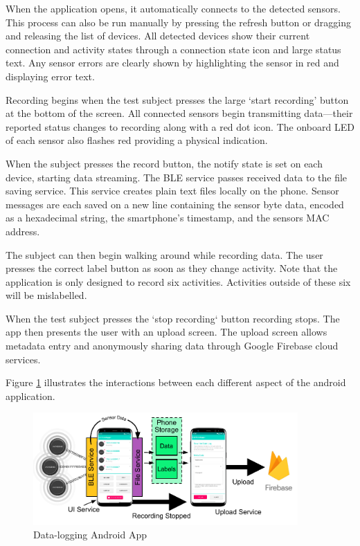 When the application opens, it automatically connects to the detected sensors. This process can also be run manually by pressing the refresh button or dragging and releasing the list of devices. All detected devices show their current connection and activity states through a connection state icon and large status text. Any sensor errors are clearly shown by highlighting the sensor in red and displaying error text.

Recording begins when the test subject presses the large `start recording' button at the bottom of the screen. All connected sensors begin transmitting data—their reported status changes to recording along with a red dot icon. The onboard LED of each sensor also flashes red providing a physical indication.

When the subject presses the record button, the notify state is set on each device, starting data streaming. The BLE service passes received data to the file saving service. This service creates plain text files locally on the phone. Sensor messages are each saved on a new line containing the sensor byte data, encoded as a hexadecimal string, the smartphone's timestamp, and the sensors MAC address.

The subject can then begin walking around while recording data. The user presses the correct label button as soon as they change activity. Note that the application is only designed to record six activities. Activities outside of these six will be mislabelled.

When the test subject presses the `stop recording` button recording stops. The app then presents the user with an upload screen. The upload screen allows metadata entry and anonymously sharing data through Google Firebase cloud services.

Figure \ref{fig:methods-android-app} illustrates the interactions between each different aspect of the android application.

\begin{figure}[!htb]
    \centering
    \includegraphics[width=0.9\textwidth]{content/3-Methods/Android_App.pdf}
    \caption{Data-logging Android App}
    \label{fig:methods-android-app}
\end{figure}


